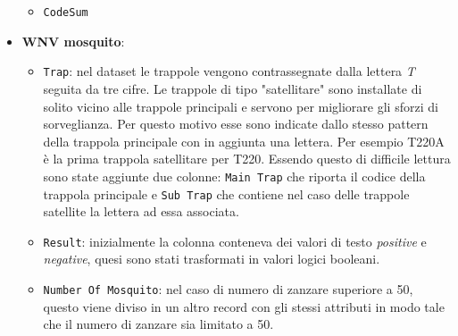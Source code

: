 \begin{itemize}
\begin{itemize}
            \item \texttt{CodeSum} %

        \end{itemize}
	
	\item \textbf{WNV mosquito}:
	
	\begin{itemize}
		
		\item \texttt{Trap}: nel dataset le trappole vengono contrassegnate dalla lettera \textit{T} seguita da tre cifre. Le trappole di tipo "satellitare" sono installate di solito vicino alle trappole principali e servono per migliorare gli sforzi di sorveglianza. Per questo motivo esse sono indicate dallo stesso pattern della trappola principale con in aggiunta una lettera. Per esempio T220A è la prima trappola satellitare per T220. Essendo questo di difficile lettura sono state aggiunte due colonne: \texttt{Main Trap} che riporta il codice della trappola principale e \texttt{Sub Trap} che contiene nel caso delle trappole satellite la lettera ad essa associata.
		
		\item \texttt{Result}: inizialmente la colonna conteneva dei valori di testo \textit{positive} e \textit{negative}, quesi sono stati trasformati in valori logici booleani.  
		
		\item \texttt{Number Of Mosquito}: nel caso di numero di zanzare superiore a 50, questo viene diviso in un altro record con gli stessi attributi in modo tale che il numero di zanzare sia limitato a 50.  
			
	\end{itemize}
	
\end{itemize}


